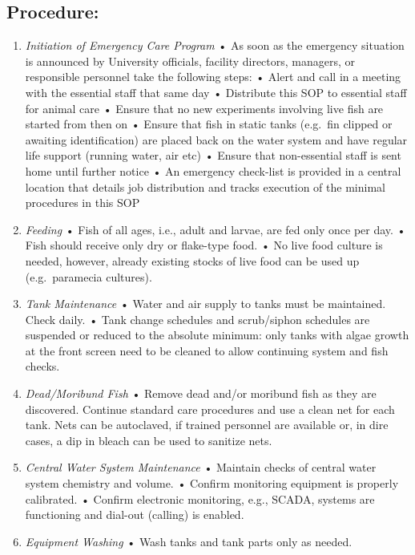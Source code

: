 \documentclass[
]{book}
\begin{document}
\hypertarget{procedure-9}{%
\subsection{Procedure:}\label{procedure-9}}

\begin{enumerate}
\def\labelenumi{\arabic{enumi}.}
\item
  \emph{Initiation of Emergency Care Program}
  • As soon as the emergency situation is announced by University officials, facility directors, managers, or responsible personnel take the following steps:
  • Alert and call in a meeting with the essential staff that same day
  • Distribute this SOP to essential staff for animal care
  • Ensure that no new experiments involving live fish are started from then on
  • Ensure that fish in static tanks (e.g.~fin clipped or awaiting identification) are placed back on the water system and have regular life support (running water, air etc)
  • Ensure that non-essential staff is sent home until further notice
  • An emergency check-list is provided in a central location that details job distribution and tracks execution of the minimal procedures in this SOP
\item
  \emph{Feeding}
  • Fish of all ages, i.e., adult and larvae, are fed only once per day.
  • Fish should receive only dry or flake-type food.
  • No live food culture is needed, however, already existing stocks of live food can be used up (e.g.~paramecia cultures).
\item
  \emph{Tank Maintenance}
  • Water and air supply to tanks must be maintained. Check daily.
  • Tank change schedules and scrub/siphon schedules are suspended or reduced to the absolute minimum: only tanks with algae growth at the front screen need to be cleaned to allow continuing system and fish checks.
\item
  \emph{Dead/Moribund Fish}
  • Remove dead and/or moribund fish as they are discovered. Continue standard care procedures and use a clean net for each tank. Nets can be autoclaved, if trained personnel are available or, in dire cases, a dip in bleach can be used to sanitize nets.
\item
  \emph{Central Water System Maintenance}
  • Maintain checks of central water system chemistry and volume.
  • Confirm monitoring equipment is properly calibrated.
  • Confirm electronic monitoring, e.g., SCADA, systems are functioning and dial-out (calling) is enabled.
\item
  \emph{Equipment Washing}
  • Wash tanks and tank parts only as needed.
\end{enumerate}
\end{document}
